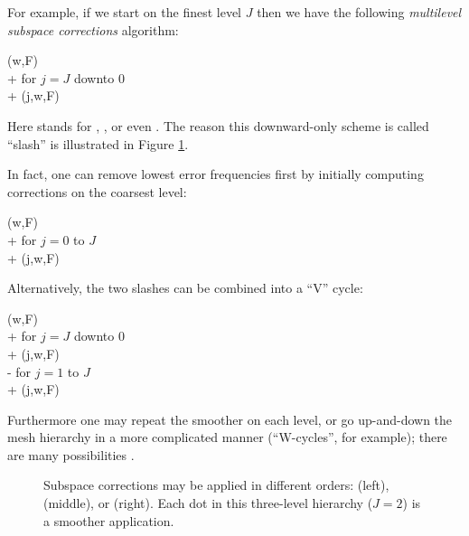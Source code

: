 \documentclass[letterpaper,final,12pt,reqno]{amsart}
\theoremstyle{claim}
\numberwithin{equation}{section}
\numberwithin{figure}{section}
\numberwithin{table}{section}
\numberwithin{theorem}{section}
\begin{document}
For example, if we start on the finest level $J$ then we have the following \emph{multilevel subspace corrections} \cite{Xu1992} algorithm:
\begin{pseudo*} \label{ps:msc-downslash}
(w,F)\text{:} \\+
    for $j=J$ downto $0$ \\+
        (j,w,F)
\end{pseudo*}
Here  stands for , , or even .  The reason this downward-only scheme is called ``slash'' is illustrated in Figure \ref{fig:msccycles}.

In fact, one can remove lowest error frequencies first by initially computing corrections on the coarsest level:
\begin{pseudo*} \label{ps:msc-upslash}
(w,F)\text{:} \\+
    for $j=0$ to $J$ \\+
        (j,w,F)
\end{pseudo*}
Alternatively, the two slashes can be combined into a ``V'' cycle:
\begin{pseudo*} \label{ps:msc-vcycle}
(w,F)\text{:} \\+
    for $j=J$ downto $0$ \\+
        (j,w,F) \\-
    for $j=1$ to $J$ \\+
        (j,w,F)
\end{pseudo*}
Furthermore one may repeat the smoother on each level, or go up-and-down the mesh hierarchy in a more complicated manner (``W-cycles'', for example); there are many possibilities \cite{Briggsetal2000,Trottenbergetal2001}.

\begin{figure}

\caption{Subspace corrections may be applied in different orders:  (left),   (middle), or  (right).  Each dot in this three-level hierarchy ($J=2$) is a smoother application.}
\label{fig:msccycles}
\end{figure}
\end{document}

